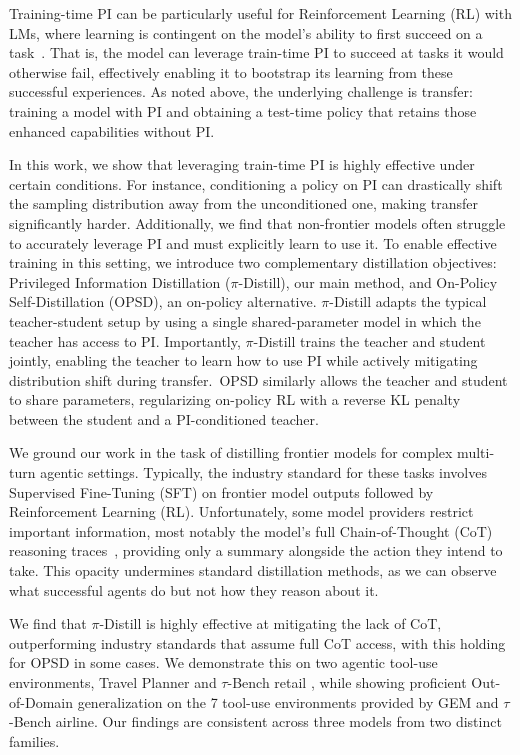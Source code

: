 \documentclass[]{servicenow} %
\begin{document}
Training-time PI can be particularly useful for Reinforcement Learning (RL) with LMs, where learning is contingent on the model's ability to first succeed on a task~\citep{yue2025doesreinforcementlearningreally}. That is, the model can leverage train-time PI to succeed at tasks it would otherwise fail, effectively enabling it to bootstrap its learning from these successful experiences. As noted above, the underlying challenge is transfer: training a model with PI and obtaining a test-time policy that retains those enhanced capabilities without PI.

In this work, we show that leveraging train-time PI is highly effective under certain conditions. For instance, conditioning a policy on PI can drastically shift the sampling distribution away from the unconditioned one, making transfer significantly harder. Additionally, we find that non-frontier models often struggle to accurately leverage PI and must explicitly learn to use it. 
To enable effective training in this setting, we introduce two complementary distillation objectives: Privileged Information Distillation ($\pi$-Distill), our main method, and On-Policy Self-Distillation (OPSD), an on-policy alternative.
$\pi$-Distill adapts the typical teacher-student setup by using a single shared-parameter model in which the teacher has access to PI.
Importantly, $\pi$-Distill trains the teacher and student jointly, enabling the teacher to learn how to use PI while actively mitigating distribution shift during transfer.~OPSD similarly allows the teacher and student to share parameters, regularizing on-policy RL with a reverse KL penalty between the student and a PI-conditioned teacher.

We ground our work in the task of distilling frontier models for complex multi-turn agentic settings. Typically, the industry standard for these tasks involves Supervised Fine-Tuning (SFT) on frontier model outputs followed by Reinforcement Learning (RL). Unfortunately, some model providers restrict important information, most notably the model's full Chain-of-Thought (CoT) reasoning traces~\citep{openai2024openaio1card}, providing only a summary alongside the action they intend to take. This opacity undermines standard distillation methods, as we can observe what successful agents do but not how they reason about it.

We find that $\pi$-Distill is highly effective at mitigating the lack of CoT, outperforming industry standards that assume full CoT access, with this holding for OPSD in some cases. We demonstrate this on two agentic tool-use environments, Travel Planner \citep{xie2024travelplannerbenchmarkrealworldplanning} and $\tau$-Bench retail \citep{yao2024taubenchbenchmarktoolagentuserinteraction}, while showing proficient Out-of-Domain generalization on the 7 tool-use environments provided by GEM \citep{liu2025gemgymagenticllms} and $\tau$-Bench airline. Our findings are consistent across three models from two distinct families.
\end{document}
